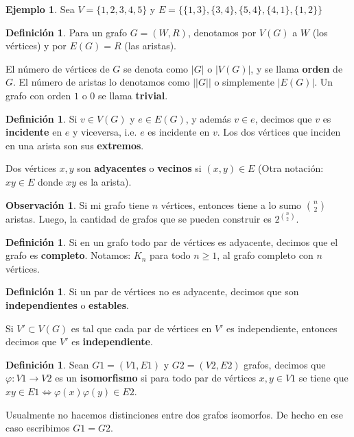 \documentclass[12pt]{report}
\theoremstyle{plain}
\theoremstyle{definition}
\newtheorem{definition}[theorem]{Definición}
\newtheorem{example}[theorem]{Ejemplo}
\newtheorem{obs}[theorem]{Observación}
\newcommand{\abs}[1]{\left \vert #1 \right \vert}
\newcommand{\Abs}[1]{\left \vert \left \vert #1 \right \vert \right \vert}
\begin{document}
\begin{example}
Sea $V = \{ 1,2,3,4,5\}$ y $E = \{ \{1,3\} , \{3,4\} , \{ 5,4\} , \{4,1 \} , \{ 1,2\}\}$


\end{example}


\begin{definition}
Para un grafo $G = (W,R)$, denotamos por $V(G)$ a $W$ (los vértices) y por $E(G) = R$ (las aristas).

El número de vértices de $G$ se denota como $\abs G$ o $\abs{V(G)}$, y se llama \textbf{orden} de $G$. El número de aristas lo denotamos como $\Abs G$ o simplemente $\abs{E(G)}$. Un grafo con orden $1$ o $0$ se llama \textbf{trivial}.
\end{definition}

\begin{definition}
Si $v \in V(G)$ y $e \in E(G)$, y además $v \in e$, decimos que $v$ es \textbf{incidente} en $e$ y viceversa, i.e. $e$ es incidente en $v$. Los dos vértices que inciden en una arista son sus \textbf{extremos}.

Dos vértices $x,y$ son \textbf{adyacentes} o \textbf{vecinos} si $(x,y) \in E$ (Otra notación: $xy \in E$ donde $xy$ es la arista).
\end{definition}

\begin{obs}
Si mi grafo tiene $n$ vértices, entonces tiene a lo sumo $\binom n 2$ aristas. Luego, la cantidad de grafos que se pueden construir es $2^{\binom n 2}$.
\end{obs}

\begin{definition}
Si en un grafo todo par de vértices es adyacente, decimos que el grafo es \textbf{completo}.
Notamos: $K_n$ para todo $n \geq 1$, al grafo completo con $n$ vértices.
\end{definition}


\begin{definition}
Si un par de vértices no es adyacente, decimos que son \textbf{independientes} o \textbf{estables}.

Si $V' \subset V(G)$ es tal que cada par de vértices en $V'$ es independiente, entonces decimos que $V'$ es \textbf{independiente}.
\end{definition}

\begin{definition}
Sean $G1 = (V1,E1)$ y $G2 = (V2, E2)$ grafos, decimos que $\varphi : V1 \rightarrow V2$ es un \textbf{isomorfismo} si para todo par de vértices $x,y \in V1$ se tiene que $xy \in E1 \Leftrightarrow \varphi (x) \varphi (y) \in E2$. 

Usualmente no hacemos distinciones entre dos grafos isomorfos. De hecho en ese caso escribimos $G1 = G2$.
\end{definition}
\end{document}
